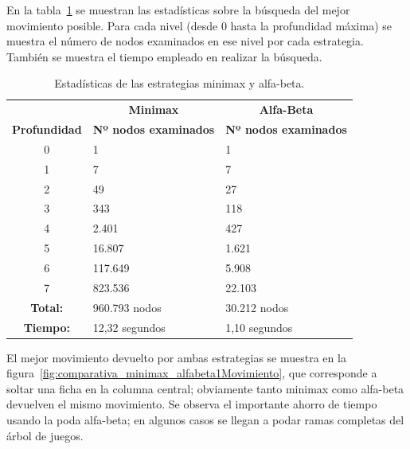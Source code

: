 En la tabla~\ref{tab:comparativa_minimax_alfabeta1} se muestran las estadísticas sobre la búsqueda del mejor movimiento posible.
Para cada nivel (desde 0 hasta la profundidad máxima) se muestra el número de nodos examinados en ese nivel por cada estrategia.
También se muestra el tiempo empleado en realizar la búsqueda.

\begin{table}[b]
\centering
\caption{Estadísticas de las estrategias minimax y alfa-beta.}
\label{tab:comparativa_minimax_alfabeta1}
\begin{tabular}{c|l|l}
\hline
& \multicolumn{1}{c|}{\textbf{Minimax}} & \multicolumn{1}{c}{\textbf{Alfa-Beta}}\\
\textbf{Profundidad} & \textbf{Nº nodos examinados} & \textbf{Nº nodos examinados} \\
0 & 1 & 1 \\
1 & 7 & 7 \\
2 & 49 & 27 \\ 
3 & 343 & 118 \\
4 & 2.401 & 427 \\
5 & 16.807 & 1.621 \\
6 & 117.649 & 5.908 \\
7 & 823.536 & 22.103 \\
\hline
\textbf{Total:} & 960.793 nodos & 30.212 nodos \\
\textbf{Tiempo:} & 12,32 segundos & 1,10 segundos \\
\hline
\end{tabular}
\end{table} 

El mejor movimiento devuelto por ambas estrategias se muestra en la figura~\ref{fig:comparativa_minimax_alfabeta1Movimiento}, que corresponde a soltar una ficha en la columna central; obviamente tanto minimax como alfa-beta devuelven el mismo movimiento.
Se observa el importante ahorro de tiempo usando la poda alfa-beta; en algunos casos se llegan a podar ramas completas del árbol de juegos.

